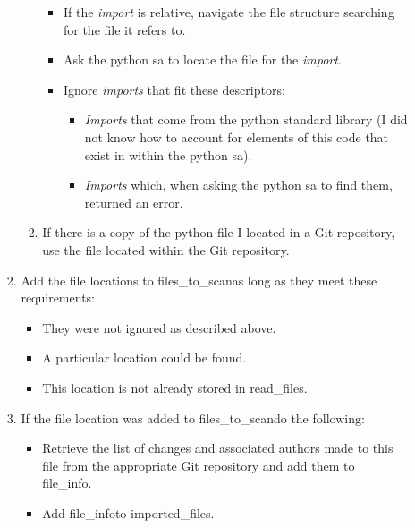 \documentclass[a4paper,man,natbib,floatsintext]{apa6}
\begin{document}
\begin{enumerate}
\begin{enumerate}
\begin{enumerate}
\begin{enumerate}
          \begin{itemize}
            \item If the \textit{import} is relative, navigate the file structure searching for the file it refers to.
            \item Ask the \Gls{python} \gls{sa} to locate the file for the \textit{import}.
            \item Ignore \textit{imports} that fit these descriptors:
            \begin{itemize}
              \item \textit{Imports} that come from the python standard library (I did not know how to account for elements of this code that exist in within the \Gls{python} \gls{sa}).
              \item \textit{Imports} which, when asking the \Gls{python} \gls{sa} to find them, returned an error.
            \end{itemize}
          \end{itemize}
          \item If there is a copy of the \Gls{python} file I located in a Git repository, use the file located within the Git repository.
        \end{enumerate}
        \item Add the file locations to \textlangle files\_to\_scan\textrangle as long as they meet these requirements:
        \begin{itemize}
          \item They were not ignored as described above.
          \item A particular location could be found.
          \item This location is not already stored in \textlangle read\_files\textrangle.
        \end{itemize}
        \item If the file location was added to \textlangle files\_to\_scan\textrangle do the following:
        \begin{itemize}
          \item Retrieve the list of changes and associated authors made to this file from the appropriate Git repository and add them to \textlangle file\_info\textrangle.
          \item Add \textlangle file\_info\textrangle to \textlangle imported\_files\textrangle.
        \end{itemize}
      \end{enumerate}      
    \end{enumerate}

\end{enumerate}
\end{document}

